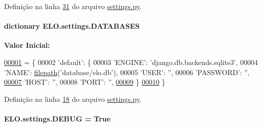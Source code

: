 Definição na linha \hyperlink{settings_8py_source_l00031}{31} do arquivo \hyperlink{settings_8py_source}{settings.\-py}.

\hypertarget{namespaceELO_1_1settings_a91ed1425b7f1cf041960832ce5b54b6e}{
\paragraph[{D\-A\-T\-A\-B\-A\-S\-E\-S}]{\setlength{\rightskip}{0pt plus 5cm}dictionary E\-L\-O.\-settings.\-D\-A\-T\-A\-B\-A\-S\-E\-S}}\label{namespaceELO_1_1settings_a91ed1425b7f1cf041960832ce5b54b6e}
{\bfseries Valor Inicial\-:}
\begin{DoxyCode}
\hypertarget{namespaceELO_1_1settings_l00001}{}\hyperlink{namespaceELO_1_1settings}{00001} = \{
00002     \textcolor{stringliteral}{'default'}: \{
00003         \textcolor{stringliteral}{'ENGINE'}: \textcolor{stringliteral}{'django.db.backends.sqlite3'}, 
00004         \textcolor{stringliteral}{'NAME'}: \hyperlink{namespaceELO_1_1settings_a7730264ddd478343e0f282f36d4a5ab4}{filepath}(\textcolor{stringliteral}{'database/elo.db'}),
00005         \textcolor{stringliteral}{'USER'}: \textcolor{stringliteral}{''},
00006         \textcolor{stringliteral}{'PASSWORD'}: \textcolor{stringliteral}{''},
\hypertarget{namespaceELO_1_1settings_l00007}{}\hyperlink{namespaceELO_1_1settings_a7730264ddd478343e0f282f36d4a5ab4}{00007}         \textcolor{stringliteral}{'HOST'}: \textcolor{stringliteral}{''},
00008         \textcolor{stringliteral}{'PORT'}: \textcolor{stringliteral}{''},
\hypertarget{namespaceELO_1_1settings_l00009}{}\hyperlink{namespaceELO_1_1settings_a62f457ac29cc6f3e85282c71ce3b4f26}{00009}     \}
\hypertarget{namespaceELO_1_1settings_l00010}{}\hyperlink{namespaceELO_1_1settings_a014930e0bf77feccc65c20212593381e}{00010} \}
\end{DoxyCode}


Definição na linha \hyperlink{settings_8py_source_l00018}{18} do arquivo \hyperlink{settings_8py_source}{settings.\-py}.

\hypertarget{namespaceELO_1_1settings_a62f457ac29cc6f3e85282c71ce3b4f26}{
\paragraph[{D\-E\-B\-U\-G}]{\setlength{\rightskip}{0pt plus 5cm}E\-L\-O.\-settings.\-D\-E\-B\-U\-G = True}}\label{namespaceELO_1_1settings_a62f457ac29cc6f3e85282c71ce3b4f26}


